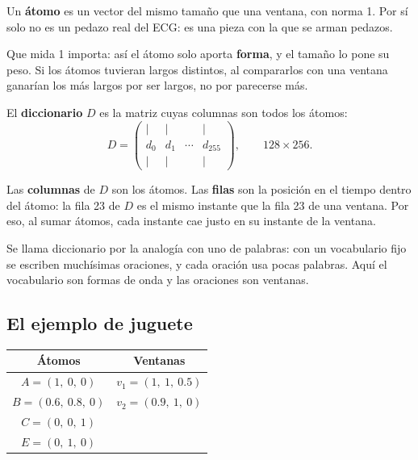 \documentclass[11pt,letterpaper]{article}
\newcommand{\cA}[1]{\textcolor{atomoA}{#1}}
\newcommand{\cB}[1]{\textcolor{atomoB}{#1}}
\newcommand{\cC}[1]{\textcolor{atomoC}{#1}}
\newcommand{\cE}[1]{\textcolor{atomoE}{#1}}
\begin{document}
\begin{definicion}[Átomo]
    Un \textbf{átomo} es un vector del mismo tamaño que una ventana,
    con norma 1. Por sí solo no es un pedazo real del ECG: es una pieza
    con la que se arman pedazos.
\end{definicion}

Que mida 1 importa: así el átomo solo aporta \textbf{forma}, y el
tamaño lo pone su peso. Si los átomos tuvieran largos distintos, al
compararlos con una ventana ganarían los más largos por ser largos, no
por parecerse más.

\begin{definicion}[Diccionario]
    El \textbf{diccionario} $D$ es la matriz cuyas columnas son todos
    los átomos:
    \[
        D = \begin{pmatrix}
                | & | & & | \\
                d_0 & d_1 & \cdots & d_{255} \\
                | & | & & |
            \end{pmatrix},
        \qquad 128 \times 256 .
    \]
\end{definicion}

Las \textbf{columnas} de $D$ son los átomos. Las \textbf{filas} son la
posición en el tiempo dentro del átomo: la fila 23 de $D$ es el mismo
instante que la fila 23 de una ventana. Por eso, al sumar átomos, cada
instante cae justo en su instante de la ventana.

Se llama diccionario por la analogía con uno de palabras: con un
vocabulario fijo se escriben muchísimas oraciones, y cada oración usa
pocas palabras. Aquí el vocabulario son formas de onda y las oraciones
son ventanas.

\subsection*{El ejemplo de juguete}

\begin{center}
\begin{tabular}{cc}
    \toprule
    \textbf{Átomos} & \textbf{Ventanas} \\
    \midrule
    \cA{$A = (1,\ 0,\ 0)$}     & $v_1 = (1,\ 1,\ 0.5)$ \\
    \cB{$B = (0.6,\ 0.8,\ 0)$} & $v_2 = (0.9,\ 1,\ 0)$ \\
    \cC{$C = (0,\ 0,\ 1)$}     & \\
    \cE{$E = (0,\ 1,\ 0)$}     & \\
    \bottomrule
\end{tabular}
\end{center}
\end{document}
